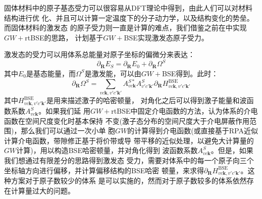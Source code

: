   固体材料中的原子基态受力可以很容易从DFT理论中得到，由此人们可以对材料结构进行优
  化、并且可以计算一定温度下的分子动力学，以及结构变化的势垒。而固体材料的激发态
  的原子受力则一直是计算的难点，我们借鉴之前在\hnamd{}中实现$GW+{}$rtBSE的思路，
  计划基于$GW+{}$BSE实现激发态原子受力。

  激发态的受力可以用体系总能量对原子坐标的偏微分来表达：
  \begin{equation}
    \partial_\mathbf{R}E_S
    = 
    \partial_\mathbf{R}E_0
    +
    \partial_\mathbf{R}\Omega^S
  \end{equation}
  其中$E_0$是基态能量，而$\Omega^S$是激发能，可以由$GW+{}$BSE得到。此时：
  \begin{equation}
    \partial_\mathbf{R}\Omega^S = \sum_{vc\mathbf{k},v'c'\mathbf{k}'}
    A^{S*}_{vc\mathbf{k}}
    A^S_{v'c'\mathbf{k}'}
    \partial_\mathbf{R}
    H_{vc\mathbf{k},v'c'\mathbf{k}'}^{\mathrm{BSE}}
  \end{equation}
  其中$H_{vc\mathbf{k},v'c'\mathbf{k}'}^{\mathrm{BSE}}$是用来描述激子的哈密顿量，
  对角化之后可以得到激子能量和波函数系数$A^{S}_{vc\mathbf{k}}$。如果我们延
  用$GW+{}$rtBSE中固定介电函数的方法，认为体系的介电函数在空间尺度变化时基本保持
  不变(激子态分布的空间尺度大于介电屏蔽作用范围)，那么我们可以通过一次小单
  胞$GW$的计算得到介电函数(或直接基于RPA近似计算介电函数，带隙修正基于将价带或导
  带平移的近似处理，以避免大计算量的$GW$计算)，用以构造BSE哈密顿量，并对角化得到
  波函数系数$A^{S}_{vc\mathbf{k}}$。但是，如果我们想通过有限差分的思路得到激发态
  受力，需要对体系中的每一个原子向三个坐标轴方向进行偏移，并计算偏移结构的BSE哈密
  顿量，来求得$ \partial_\mathbf{R}
  H_{vc\mathbf{k},v'c'\mathbf{k}'}^{\mathrm{BSE}} $。这种方案对于原子数较少的体系
  是可以实施的，然而对于原子数较多的体系依然存在计算量过大的问题。

